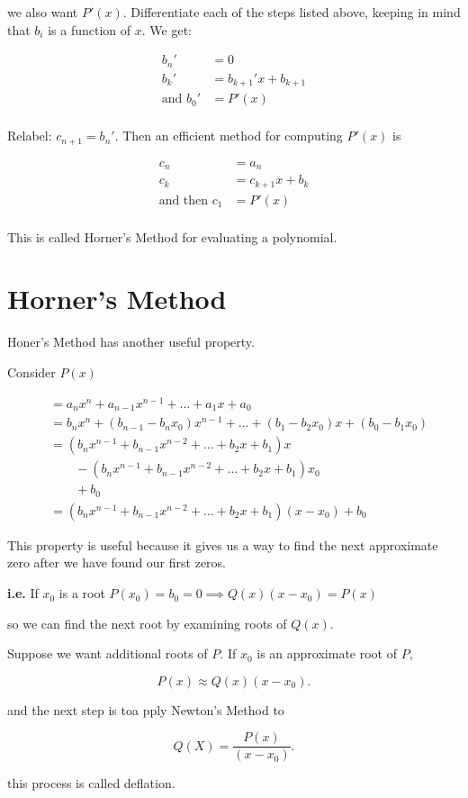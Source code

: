 \documentclass[12pt]{article}
\newcommand{\ie}{\textbf{i.e.}\xspace}
\begin{document}
we also want $P'(x)$. Differentiate each of the steps listed above, keeping in
mind that $b_i$ is a function of $x$. We get:

\begin{align*}
  b_n ' &= 0 \\
  b_k' &= b_{k+1}'x + b_{k+1} \\
  \text{and } b_0' &= P'(x) \\
\end{align*}

Relabel: $c_{n+1} = b_n'$. Then an efficient method for computing $P'(x)$ is

\begin{align*}
  c_n &= a_n \\
  c_k &=  c_{k+1}x + b_{k} \\
  \text{and then } c_1 &= P'(x) \\
\end{align*}

This is called Horner's Method for evaluating a polynomial.

\section{Horner's Method}

Honer's Method has another useful property. 

Consider $P(x)$

\begin{align*}
    &= a_n x^n + a_{n-1} x^{n-1} + \dots + a_1 x + a_0 \\
    &= b_n x^n + (b_{n-1} - b_n x_0) x^{n-1} + \dots + (b_1 - b_2 x_0) x + (b_0 - b_1 x_0) \\
    &= (b_n x^{n-1} + b_{n-1} x^{n-2} + \dots + b_2 x + b_1) x \\
    &\qquad - (b_n x^{n-1} + b_{n-1} x^{n-2} + \dots + b_2 x + b_1) x_0 \\
    &\qquad + b_0 \\
    &= (b_n x^{n-1} + b_{n-1} x^{n-2} + \dots + b_2 x + b_1) (x - x_0) + b_0
\end{align*}

This property is useful because it gives us a way to find the next approximate
zero after we have found our first zeros.

\ie If $x_0$ is a root $P(x_0) = b_0 = 0\implies Q(x) (x-x_0) = P(x)$

so we can find the next root by examining roots of $Q(x)$.

Suppose we want additional roots of $P$. If $x_0$ is an approximate root of $P$,

\[
  P(x) \approx Q(x) (x-x_0) 
.\]

and the next step is toa pply Newton's Method to 

\[
  \displaystyle Q(X) = \frac{P(x)}{(x-x_0)}
.\]

this process is called deflation.
\end{document}
